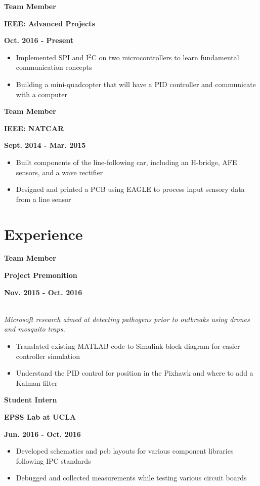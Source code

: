 \documentclass[12pt]{article}
\newcommand\textbox[1]{\parbox{.333\textwidth}{#1}}
\newcommand{\textlcr}[3]{\textbox{\textbf{#1}\hfill}\textbox{\hfil \textbf{#2}\hfil}\textbox{\hfill \textbf{#3}}}
\begin{document}
\bigskip
\textlcr{Team Member}{IEEE: Advanced Projects}{Oct. 2016 - Present}
\begin{itemize}
\item Implemented SPI and I$^2$C on two microcontrollers to learn fundamental communication concepts
\item Building a mini-quadcopter that will have a PID controller and communicate with a computer 
\end{itemize}

\bigskip
\textlcr{Team Member}{IEEE: NATCAR}{Sept. 2014 - Mar. 2015}
\begin{itemize}
\item Built components of the line-following car, including an H-bridge, AFE sensors, and a wave rectifier
\item Designed and printed a PCB using EAGLE to process input sensory data from a line sensor
\end{itemize}

\iffalse
\bigskip
\textlcr{Audio-Interface Clock}{Introduction to EE}{Jan. 2014 - Mar. 2014}
\begin{itemize}
\item Programmed using LabVIEW a finite-state machine for processing audio input
\item Implemented a circuit to detect audio cues, allowing interaction with the alarm clock
\end{itemize}
\fi

\section*{Experience}
\vspace*{-1em}\makebox[\linewidth]{\rule{\textwidth}{0.4pt}}

\textlcr{Team Member}{Project Premonition}{Nov. 2015 - Oct. 2016}
\\ \textit{Microsoft research aimed at detecting pathogens prior to outbreaks using drones and mosquito traps.}
\begin{itemize}
\item Translated existing MATLAB code to Simulink block diagram for easier controller simulation
\item Understand the PID control for position in the Pixhawk and where to add a Kalman filter
\end{itemize}

\bigskip
\textlcr{Student Intern}{EPSS Lab at UCLA}{Jun. 2016 - Oct. 2016}
\begin{itemize}
\item Developed schematics and pcb layouts for various component libraries following IPC standards
\item Debugged and collected measurements while testing various circuit boards
\end{itemize}
\end{document}
